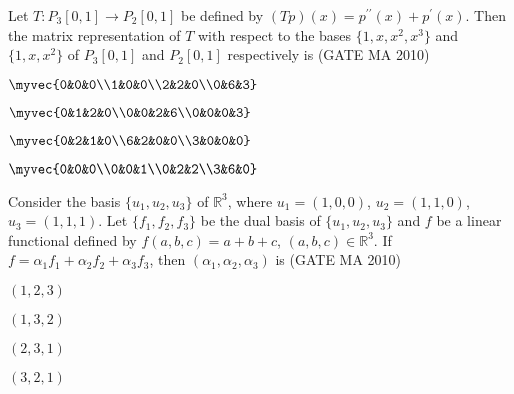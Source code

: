 \item Let $T:P_3[0,1]\to P_2[0,1]$ be defined by $(Tp)(x)=p^{\prime\prime}(x)+p^{\prime}(x)$. Then the matrix representation of $T$ with respect to the bases $\{1,x,x^2,x^3\}$ and $\{1,x,x^2\}$ of $P_3[0,1]$ and $P_2[0,1]$ respectively is \underline{\hspace{2cm}}
\hfill(GATE MA 2010)
\begin{enumerate}
\begin{multicols}{4}
\item $\myvec{0&0&0\\1&0&0\\2&2&0\\0&6&3}$
\item $\myvec{0&1&2&0\\0&0&2&6\\0&0&0&3}$
\item $\myvec{0&2&1&0\\6&2&0&0\\3&0&0&0}$
\item $\myvec{0&0&0\\0&0&1\\0&2&2\\3&6&0}$
\end{multicols}
\end{enumerate}
\item Consider the basis $\{u_1,u_2,u_3\}$ of $\mathbb{R}^3$, where $u_1=(1,0,0)$, $u_2=(1,1,0)$, $u_3=(1,1,1)$. Let $\{f_1,f_2,f_3\}$ be the dual basis of $\{u_1,u_2,u_3\}$ and $f$ be a linear functional defined by $f(a,b,c)=a+b+c$, $(a,b,c)\in\mathbb{R}^3$. If $f=\alpha_1f_1+\alpha_2f_2+\alpha_3f_3$, then $(\alpha_1,\alpha_2,\alpha_3)$ is \underline{\hspace{2cm}}
\hfill(GATE MA 2010)
\begin{enumerate}
\begin{multicols}{4}
\item $(1,2,3)$
\item $(1,3,2)$
\item $(2,3,1)$
\item $(3,2,1)$
\end{multicols}
\end{enumerate}


